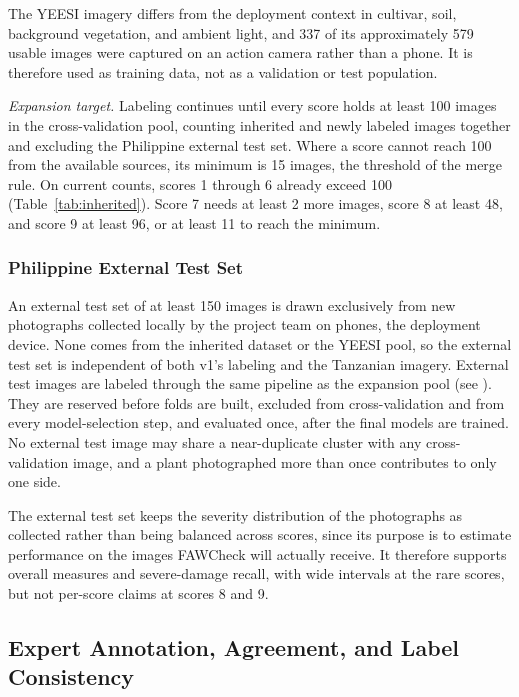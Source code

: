 \documentclass{icsthesis}
\newcommand{\secref}[1]{\textit{\nameref{#1}}}
\begin{document}
\begin{mainmatter}
					The YEESI imagery differs from the
					deployment context in cultivar, soil, background vegetation, and ambient light,
					and 337 of its approximately 579 usable images were captured on an action camera
					rather than a phone. It is therefore used as training data, not as a validation
					or test population.

					\textit{Expansion target.} Labeling continues until every score holds at least
					100 images in the cross-validation pool, counting inherited and newly labeled
					images together and excluding the Philippine external test set. Where a score
					cannot reach 100 from the available sources, its minimum is 15 images, the
					threshold of the merge rule. On current counts, scores 1 through 6 already
					exceed 100 (Table~\ref{tab:inherited}). Score 7 needs at least 2 more images,
					score 8 at least 48, and score 9 at least 96, or at least 11 to reach the
					minimum.

				\subsubsection{Philippine External Test Set}\label{sec:holdout}

					An external test set of at least 150 images is drawn exclusively from new
					photographs collected locally by the project team on phones, the deployment
					device. None comes from the inherited dataset or the YEESI pool, so the external
					test set is independent of both v1's labeling and the Tanzanian imagery.
					External test images are labeled through the same pipeline as the expansion pool
					(see \secref{sec:labeling}). They are reserved before folds are built, excluded
					from cross-validation and from every model-selection step, and evaluated once,
					after the final models are trained. No external test image may share a
					near-duplicate cluster with any cross-validation image, and a plant photographed
					more than once contributes to only one side.

					The external test set keeps the severity distribution of the photographs as
					collected rather than being balanced across scores, since its purpose is to
					estimate performance on the images FAWCheck will actually receive. It therefore
					supports overall measures and severe-damage recall, with wide intervals at the
					rare scores, but not per-score claims at scores 8 and 9.

			\subsection{Expert Annotation, Agreement, and Label Consistency}\label{sec:annotation}


\end{mainmatter}
\end{document}
